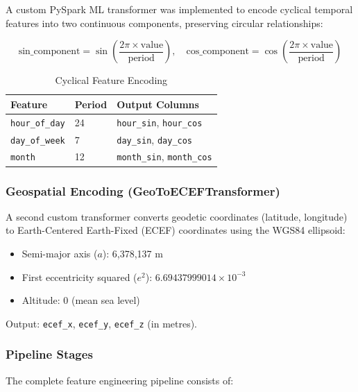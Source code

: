 A custom PySpark ML transformer was implemented to encode cyclical temporal features into two continuous components, preserving circular relationships:

\begin{equation}
\text{sin\_component} = \sin\left(\frac{2\pi \times \text{value}}{\text{period}}\right),\quad
\text{cos\_component} = \cos\left(\frac{2\pi \times \text{value}}{\text{period}}\right)
\end{equation}

\begin{table}[H]
\centering
\caption{Cyclical Feature Encoding}
\label{tab:cyclical}
\begin{tabular}{lll}
\toprule
\textbf{Feature} & \textbf{Period} & \textbf{Output Columns} \\
\midrule
\texttt{hour\_of\_day} & 24 & \texttt{hour\_sin}, \texttt{hour\_cos} \\
\texttt{day\_of\_week} & 7 & \texttt{day\_sin}, \texttt{day\_cos} \\
\texttt{month} & 12 & \texttt{month\_sin}, \texttt{month\_cos} \\
\bottomrule
\end{tabular}
\end{table}

\subsubsection{Geospatial Encoding (GeoToECEFTransformer)}

A second custom transformer converts geodetic coordinates (latitude, longitude) to Earth-Centered Earth-Fixed (ECEF) coordinates using the WGS84 ellipsoid:

\begin{itemize}
    \item Semi-major axis ($a$): 6,378,137 m
    \item First eccentricity squared ($e^2$): $6.69437999014 \times 10^{-3}$
    \item Altitude: 0 (mean sea level)
\end{itemize}

Output: \texttt{ecef\_x}, \texttt{ecef\_y}, \texttt{ecef\_z} (in metres).

\subsubsection{Pipeline Stages}

The complete feature engineering pipeline consists of:

